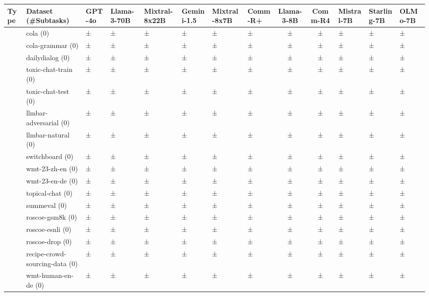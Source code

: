 \begin{tabular}{llllllll|cc}
\toprule
Type & Dataset (\#Subtasks) & GPT-4o & Llama-3-70B & Mixtral-8x22B & Gemini-1.5 & Mixtral-8x7B & Comm-R+ & Llama-3-8B & Comm-R4 & Mistral-7B & Starling-7B & OLMo-7B \\
\midrule
 & cola (0) &  ± &  ± &  ± &  ± &  ± &  ± &  ± &  ± &  ± &  ± &  ± \\
 & cola-grammar (0) &  ± &  ± &  ± &  ± &  ± &  ± &  ± &  ± &  ± &  ± &  ± \\
 & dailydialog (0) &  ± &  ± &  ± &  ± &  ± &  ± &  ± &  ± &  ± &  ± &  ± \\
 & toxic-chat-train (0) &  ± &  ± &  ± &  ± &  ± &  ± &  ± &  ± &  ± &  ± &  ± \\
 & toxic-chat-test (0) &  ± &  ± &  ± &  ± &  ± &  ± &  ± &  ± &  ± &  ± &  ± \\
 & llmbar-adversarial (0) &  ± &  ± &  ± &  ± &  ± &  ± &  ± &  ± &  ± &  ± &  ± \\
 & llmbar-natural (0) &  ± &  ± &  ± &  ± &  ± &  ± &  ± &  ± &  ± &  ± &  ± \\
 & switchboard (0) &  ± &  ± &  ± &  ± &  ± &  ± &  ± &  ± &  ± &  ± &  ± \\
 & wmt-23-zh-en (0) &  ± &  ± &  ± &  ± &  ± &  ± &  ± &  ± &  ± &  ± &  ± \\
 & wmt-23-en-de (0) &  ± &  ± &  ± &  ± &  ± &  ± &  ± &  ± &  ± &  ± &  ± \\
 & topical-chat (0) &  ± &  ± &  ± &  ± &  ± &  ± &  ± &  ± &  ± &  ± &  ± \\
 & summeval (0) &  ± &  ± &  ± &  ± &  ± &  ± &  ± &  ± &  ± &  ± &  ± \\
 & roscoe-gsm8k (0) &  ± &  ± &  ± &  ± &  ± &  ± &  ± &  ± &  ± &  ± &  ± \\
 & roscoe-esnli (0) &  ± &  ± &  ± &  ± &  ± &  ± &  ± &  ± &  ± &  ± &  ± \\
 & roscoe-drop (0) &  ± &  ± &  ± &  ± &  ± &  ± &  ± &  ± &  ± &  ± &  ± \\
 & recipe-crowd-sourcing-data (0) &  ± &  ± &  ± &  ± &  ± &  ± &  ± &  ± &  ± &  ± &  ± \\
 & wmt-human-en-de (0) &  ± &  ± &  ± &  ± &  ± &  ± &  ± &  ± &  ± &  ± &  ± \\

\end{tabular}
